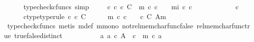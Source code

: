 \begin{isabellebody}
\ \ \ \ \isamarkupfalse%
\ {\isacharparenleft}{\kern0pt}typecheck{\isacharunderscore}{\kern0pt}cfuncs{\isacharcomma}{\kern0pt}\ simp{\isacharparenright}{\kern0pt}\isanewline
\ \ \isamarkupfalse%
\ {\isachardoublequoteopen}{\isasymAnd}\ c{\isachardot}{\kern0pt}\ c\ {\isasymin}\isactrlsub c\ C\ {\isasymLongrightarrow}\ {\isacharparenleft}{\kern0pt}{\isasymchi}m\ {\isasymcirc}\isactrlsub c\ c\ {\isacharequal}{\kern0pt}\ {\isasymt}{\isacharparenright}{\kern0pt}\ {\isacharequal}{\kern0pt}\ {\isacharparenleft}{\kern0pt}{\isasymchi}mi\ {\isasymcirc}\isactrlsub c\ c\ {\isacharequal}{\kern0pt}\ {\isasymt}{\isacharparenright}{\kern0pt}{\isachardoublequoteclose}\isanewline
\ \ \isamarkupfalse%
\ {\isacharminus}{\kern0pt}\isanewline
\ \ \ \ \isamarkupfalse%
\ c\isanewline
\ \ \ \ \isamarkupfalse%
\ c{\isacharunderscore}{\kern0pt}type{\isacharbrackleft}{\kern0pt}type{\isacharunderscore}{\kern0pt}rule{\isacharbrackright}{\kern0pt}{\isacharcolon}{\kern0pt}\ {\isachardoublequoteopen}c\ {\isasymin}\isactrlsub c\ C{\isachardoublequoteclose}\isanewline
\ \ \ \ \isamarkupfalse%
\ {\isachardoublequoteopen}{\isacharparenleft}{\kern0pt}{\isasymchi}m\ {\isasymcirc}\isactrlsub c\ c\ {\isacharequal}{\kern0pt}\ {\isasymt}{\isacharparenright}{\kern0pt}\ {\isacharequal}{\kern0pt}\ {\isacharparenleft}{\kern0pt}c\ {\isasymin}\isactrlbsub C\isactrlesub \ {\isacharparenleft}{\kern0pt}A{\isacharcomma}{\kern0pt}m{\isacharparenright}{\kern0pt}{\isacharparenright}{\kern0pt}{\isachardoublequoteclose}\isanewline
\ \ \ \ \ \ \isamarkupfalse%
\ {\isacharparenleft}{\kern0pt}typecheck{\isacharunderscore}{\kern0pt}cfuncs{\isacharcomma}{\kern0pt}\ metis\ {\isasymchi}m{\isacharunderscore}{\kern0pt}def\ m{\isacharunderscore}{\kern0pt}mono\ not{\isacharunderscore}{\kern0pt}rel{\isacharunderscore}{\kern0pt}mem{\isacharunderscore}{\kern0pt}char{\isacharunderscore}{\kern0pt}func{\isacharunderscore}{\kern0pt}false\ rel{\isacharunderscore}{\kern0pt}mem{\isacharunderscore}{\kern0pt}char{\isacharunderscore}{\kern0pt}func{\isacharunderscore}{\kern0pt}true\ true{\isacharunderscore}{\kern0pt}false{\isacharunderscore}{\kern0pt}distinct{\isacharparenright}{\kern0pt}\isanewline
\ \ \ \ \isamarkupfalse%
\ \isamarkupfalse%
\ {\isachardoublequoteopen}{\isachardot}{\kern0pt}{\isachardot}{\kern0pt}{\isachardot}{\kern0pt}\ {\isacharequal}{\kern0pt}\ {\isacharparenleft}{\kern0pt}{\isasymexists}\ a{\isachardot}{\kern0pt}\ a\ {\isasymin}\isactrlsub c\ A\ {\isasymand}\ c\ {\isacharequal}{\kern0pt}\ m\ {\isasymcirc}\isactrlsub c\ a{\isacharparenright}{\kern0pt}{\isachardoublequoteclose}\isanewline

\end{isabellebody}
